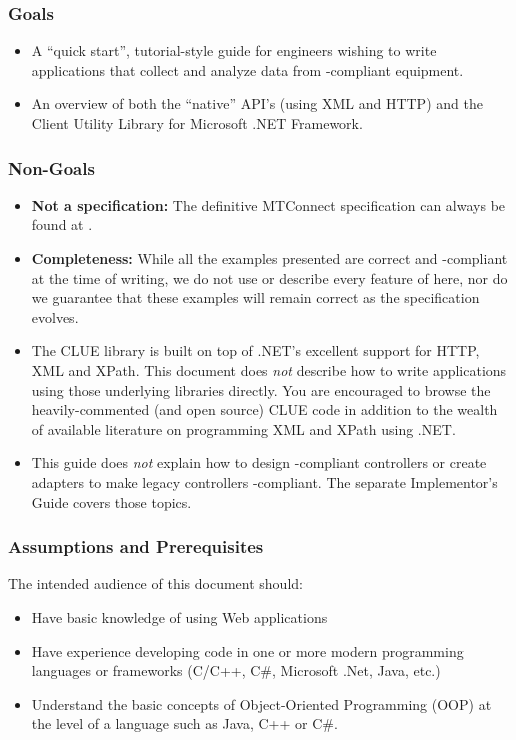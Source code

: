 \subsubsection{Goals}

\begin{itemize}
\item A ``quick start'', tutorial-style guide
for engineers wishing to write applications
that collect and analyze data from \mtc-compliant equipment.  
\item An overview of both the \mtc{} ``native'' API's (using XML and
  HTTP) and the \mtc{} Client Utility Library for Microsoft .NET
  Framework.
\end{itemize}

\subsubsection{Non-Goals}

\begin{itemize}
\item  \textbf{Not a specification:}  The definitive
MTConnect specification can always be found at \website.  
\item \textbf{Completeness:}
While all the
examples presented are correct and \mtc-compliant
at the time of writing, we do not use or describe every
feature of \mtc{} here, nor do we guarantee that these
examples will remain correct as the specification evolves.
\item The CLUE library is built on top of .NET's excellent support for
  HTTP, XML and XPath.  This document does \emph{not} describe how to
  write applications using those underlying libraries directly.  You are
  encouraged to browse the heavily-commented (and open source) CLUE code
  in addition to the wealth of available literature on programming XML
  and XPath using .NET.
\item This guide does \emph{not} explain how to design \mtc-compliant
  controllers or create adapters to make legacy controllers
  \mtc-compliant. The separate
\mtc{} Implementor's Guide covers those topics.
\end{itemize}

\subsubsection{Assumptions and Prerequisites}

The intended audience of this document should:
\begin{itemize}
\item Have basic knowledge of using Web applications
\item Have experience developing code in one or more modern programming
  languages or frameworks (C/C++, C\#, Microsoft .Net, Java, etc.)
\item Understand the basic concepts of Object-Oriented Programming (OOP)
  at the level of a language such as Java, C++ or C\#.
\end{itemize}


